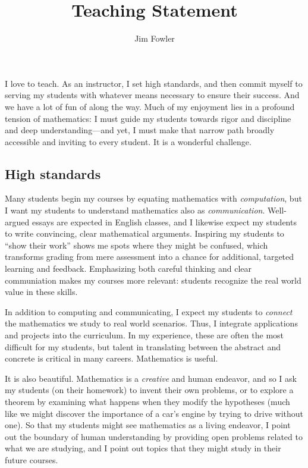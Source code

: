 \documentclass[12pt]{amsart}
\title{Teaching Statement}
\author{Jim Fowler}
\begin{document}
\maketitle

I love to teach.  As an instructor, I set high standards, and then
commit myself to serving my students with whatever means necessary to
ensure their success.  And we have a lot of fun of along the way.
Much of my enjoyment lies in a profound tension of mathematics: I must
guide my students towards rigor and discipline and deep
understanding---and yet, I must make that narrow path broadly
accessible and inviting to every student.  It is a wonderful
challenge.

\subsection*{High standards}

Many students begin my courses by equating mathematics with
\textit{computation}, but I want my students to understand mathematics
also as \textit{communication}.  Well-argued essays are expected in
English classes, and I likewise expect my students to write
convincing, clear mathematical arguments.  Inspiring my students to
``show their work'' shows me spots where they might be confused, which
transforms grading from mere assessment into a chance for additional,
targeted learning and feedback.  Emphasizing both careful thinking and
clear communiation makes my courses more relevant: students recognize
the real world value in these skills.

In addition to computing and communicating, I expect my students to
\textit{connect} the mathematics we study to real world scenarios.
Thus, I integrate applications and projects into the curriculum.  In
my experience, these are often the most difficult for my students, but
talent in translating between the abstract and concrete is critical in
many careers.  Mathematics is useful.

It is also beautiful.  Mathematics is a \textit{creative} and human
endeavor, and so I ask my students (on their homework) to invent their
own problems, or to explore a theorem by examining what happens when
they modify the hypotheses (much like we might discover the importance
of a car's engine by trying to drive without one).  So that my
students might see mathematics as a living endeavor, I point out the
boundary of human understanding by providing open problems related to
what we are studying, and I point out topics that they might study in
their future courses.
\end{document}
